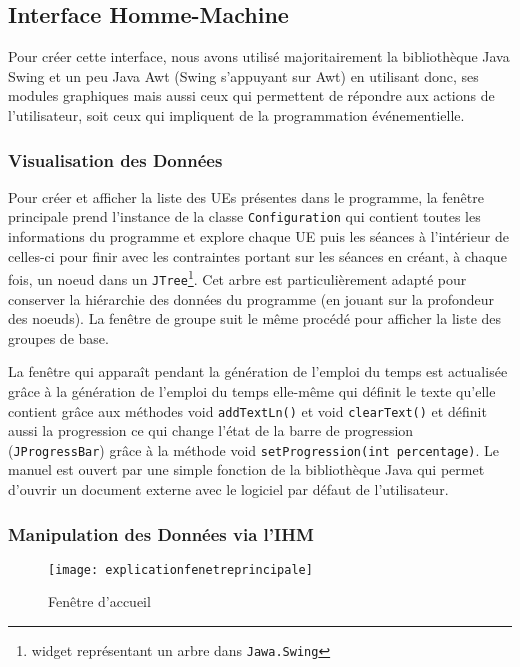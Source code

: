 \documentclass[12pt,a4paper]{article}
\begin{document}
\subsection{Interface Homme-Machine}
\label{ihmimpl}

Pour créer cette interface, nous avons utilisé majoritairement la bibliothèque Java Swing et un peu Java Awt (Swing s’appuyant sur Awt) en utilisant donc, ses modules graphiques mais aussi ceux qui permettent de répondre aux actions de l’utilisateur, soit ceux qui impliquent de la programmation événementielle.

\subsubsection{Visualisation des Données}

Pour créer et afficher la liste des UEs présentes dans le programme, la fenêtre principale prend l’instance de la classe \texttt{Configuration} qui contient toutes les informations du programme et explore chaque UE puis les séances à l’intérieur de celles-ci pour finir avec les contraintes portant sur les séances en créant, à chaque fois, un noeud dans un \texttt{JTree}\footnote{widget représentant un arbre dans \texttt{Jawa.Swing}}. Cet arbre est particulièrement adapté pour conserver la hiérarchie des données du programme (en jouant sur la profondeur des noeuds). La fenêtre de groupe suit le même procédé pour afficher la liste des groupes de base.

La fenêtre qui apparaît pendant la génération de l’emploi du temps est actualisée grâce à la génération de l’emploi du temps elle-même qui définit le texte qu’elle contient grâce aux méthodes void \texttt{addTextLn()} et void \texttt{clearText()} et définit aussi la progression ce qui change l’état de la barre de progression (\texttt{JProgressBar}) grâce à la méthode void \texttt{setProgression(int percentage)}.
Le manuel est ouvert par une simple fonction de la bibliothèque Java qui permet d’ouvrir un document externe avec le logiciel par défaut de l'utilisateur.

\subsubsection{Manipulation des Données via l'IHM}

\begin{figure}[h]
    \centering
    \texttt{[image: explicationfenetreprincipale]}
    \caption{\label{homewindow} Fenêtre d'accueil}
\end{figure}
\end{document}
